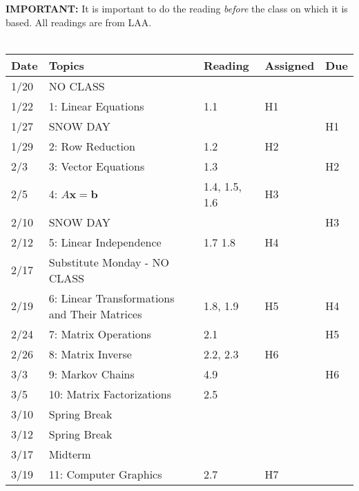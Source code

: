 \documentclass[11pt]{article}
\begin{document}
\textbf{IMPORTANT:} It is important to do the reading \emph{before} the class on
which it is based.   All readings are from LAA.
\\~\\
\small
\begin{centering}
\begin{tabular}{||l|p{3in}|l|l|l||}
\hline\hline
Date & Topics  & Reading & Assigned & Due  \\
\hline\hline
1/20 & NO CLASS &&& \\
1/22 & 1: Linear Equations & 1.1 & H1  & \\
\hline

1/27 & SNOW DAY &  & & H1 \\
1/29 & 2: Row Reduction & 1.2  & H2 & \\
\hline

2/3 & 3: Vector Equations & 1.3 & & H2 \\
2/5 & 4: $A\mathbf{x} =\mathbf{b}$  & 1.4, 1.5, 1.6 & H3 & \\
\hline

2/10 & SNOW DAY & & & H3 \\
2/12 & 5: Linear Independence & 1.7 1.8 & H4 & \\ %
\hline

2/17 & Substitute Monday - NO CLASS & & &\\
2/19 & 6: Linear Transformations and Their Matrices  & 1.8, 1.9 & H5 & H4 \\
\hline

2/24 & 7: Matrix Operations  & 2.1 & & H5\\ 
2/26 & 8: Matrix Inverse & 2.2, 2.3 & H6 &\\ 
\hline

% 
3/3 & 9: Markov Chains & 4.9 & & H6 \\  
3/5 & 10: Matrix Factorizations & 2.5 & & \\ %
\hline

3/10 & Spring Break &&&\\
3/12 & Spring Break &&&\\
\hline

3/17 & Midterm & & &\\
3/19 & 11: Computer Graphics & 2.7 & H7 &\\ 
\hline


\end{tabular}
\end{centering}
\end{document}

